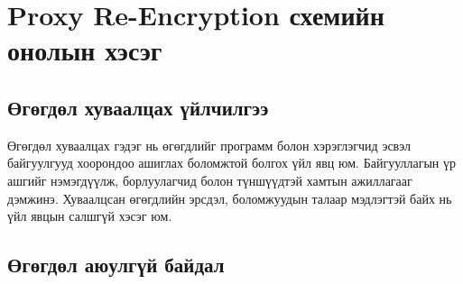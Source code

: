 
\chapter{Proxy Re-Encryption схемийн онолын хэсэг} %
\label{Chapter1} %
\pagecolor{white}

\newcommand{\keyword}[1]{\textbf{#1}}
\newcommand{\tabhead}[1]{\textbf{#1}}
\newcommand{\code}[1]{\texttt{#1}}
\newcommand{\file}[1]{\texttt{\bfseries#1}}
\newcommand{\option}[1]{\texttt{\itshape#1}}


\section{Өгөгдөл хуваалцах үйлчилгээ}
Өгөгдөл хуваалцах гэдэг нь өгөгдлийг программ болон хэрэглэгчид эсвэл байгуулгууд хоорондоо ашиглах боломжтой болгох үйл явц юм. Байгууллагын үр ашгийг нэмэгдүүлж, борлуулагчид болон түншүүдтэй хамтын ажиллагааг дэмжинэ. Хуваалцсан өгөгдлийн эрсдэл, боломжуудын талаар мэдлэгтэй байх нь үйл явцын салшгүй хэсэг юм.


\section{Өгөгдөл аюулгүй байдал}



